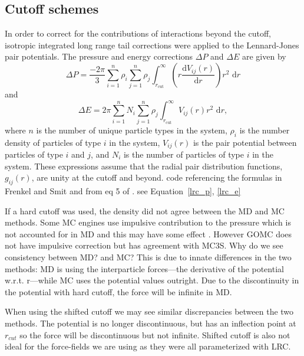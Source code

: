 \subsection{Cutoff schemes}\label{sec:cutoff}

In order to correct for the contributions of interactions beyond the cutoff, isotropic integrated long range tail corrections were applied to the Lennard-Jones pair potentials. The pressure and energy corrections $\Delta P$ and $\Delta E$ are given by
\begin{equation}\label{lrc_p}
    \Delta P = \frac{-2\pi}{3} \sum_{i=1}^{n} \rho_i \sum_{j=1}^{n} \rho_j
    \int_{r_\mathrm{cut}}^{\infty} \left( r
    \frac{\mathrm{d}V_{ij}(r)}{\mathrm{d}r} \right) r^2 \,\,\mathrm{d}r  
\end{equation}
and
\begin{equation}\label{lrc_e}
    \Delta E = 2\pi \sum_{i=1}^{n} N_i \sum_{j=1}^{n} \rho_j
    \int_{r_\mathrm{cut}}^{\infty} V_{ij}(r) r^2\,\,\mathrm{d}r, 
\end{equation}
where $n$ is the number of unique particle types in the system, $\rho_{i}$ is the number density of particles of type $i$ in the system, $V_{ij}(r)$ is the pair potential between particles of type $i$ and $j$, and $N_{i}$ is the number of particles of type $i$ in the system. These expressions assume that the radial pair distribution functions, $g_{ij}(r)$, are unity at the cutoff and beyond. code referencing the formulas in Frenkel and Smit \citep{frenkel2001understanding} and from eq 5 of  \citep{Sun1998}. see Equation~\eqref{lrc_p}, \eqref{lrc_e}

If a hard cutoff was used, the density did not agree between the MD and MC methods.
Some MC engines use impulsive contribution to the pressure which is not accounted for in MD and this may have some effect \citep{frenkel2001understanding}.
However GOMC does not have impulsive correction but has agreement with MC3S. Why do we see consistency between MD? and MC?
This is due to innate differences in the two methods: MD is using the interparticle forces---the derivative of the potential w.r.t. r---while MC uses the potential values outright.
Due to the discontinuity in the potential with hard cutoff, the force will be infinite in MD.

When using the shifted cutoff we may see similar discrepancies between the two methods. 
The potential is no longer discontinuous, but has an inflection point at $r_{cut}$ so the force will be discontinuous but not infinite.
Shifted cutoff is also not ideal for the force-fields we are using as they were all parameterized with LRC. 


